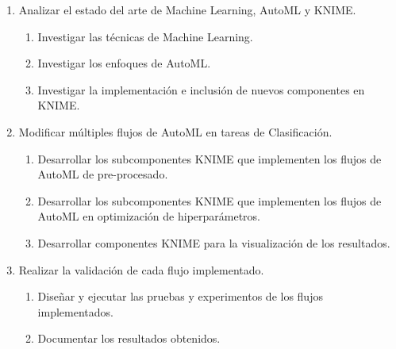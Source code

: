 \begin{enumerate}
	\item Analizar el estado del arte de Machine Learning, AutoML y KNIME. 
	\begin{enumerate}
		\item Investigar las técnicas de Machine Learning. 
		\item Investigar los enfoques de AutoML. 
		\item Investigar la implementación e inclusión de nuevos componentes en KNIME.
	\end{enumerate}
	\item Modificar múltiples flujos de AutoML en tareas de Clasificación. 
	\begin{enumerate}
		\item Desarrollar los subcomponentes KNIME que implementen los flujos de AutoML de pre-procesado. 
		\item Desarrollar los subcomponentes KNIME que implementen los flujos de AutoML en optimización de hiperparámetros.
		\item Desarrollar componentes KNIME para la visualización de los resultados. 
	\end{enumerate}
	\item Realizar la validación de cada flujo implementado.
	\begin{enumerate}
		\item Diseñar y ejecutar las pruebas y experimentos de los flujos implementados. 
		\item Documentar los resultados obtenidos.
	\end{enumerate} 
\end{enumerate}

